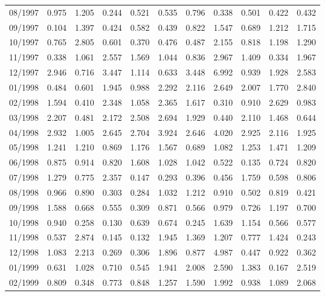 \begin{tabular}{lrrrrrrrrrr}
08/1997 &  0.975 &  1.205 &  0.244 &  0.521 &  0.535 &  0.796 &  0.338 &  0.501 &  0.422 &  0.432 \\
09/1997 &  0.104 &  1.397 &  0.424 &  0.582 &  0.439 &  0.822 &  1.547 &  0.689 &  1.212 &  1.715 \\
10/1997 &  0.765 &  2.805 &  0.601 &  0.370 &  0.476 &  0.487 &  2.155 &  0.818 &  1.198 &  1.290 \\
11/1997 &  0.338 &  1.061 &  2.557 &  1.569 &  1.044 &  0.836 &  2.967 &  1.409 &  0.334 &  1.967 \\
12/1997 &  2.946 &  0.716 &  3.447 &  1.114 &  0.633 &  3.448 &  6.992 &  0.939 &  1.928 &  2.583 \\
01/1998 &  0.484 &  0.601 &  1.945 &  0.988 &  2.292 &  2.116 &  2.649 &  2.007 &  1.770 &  2.840 \\
02/1998 &  1.594 &  0.410 &  2.348 &  1.058 &  2.365 &  1.617 &  0.310 &  0.910 &  2.629 &  0.983 \\
03/1998 &  2.207 &  0.481 &  2.172 &  2.508 &  2.694 &  1.929 &  0.440 &  2.110 &  1.468 &  0.644 \\
04/1998 &  2.932 &  1.005 &  2.645 &  2.704 &  3.924 &  2.646 &  4.020 &  2.925 &  2.116 &  1.925 \\
05/1998 &  1.241 &  1.210 &  0.869 &  1.176 &  1.567 &  0.689 &  1.082 &  1.253 &  1.471 &  1.209 \\
06/1998 &  0.875 &  0.914 &  0.820 &  1.608 &  1.028 &  1.042 &  0.522 &  0.135 &  0.724 &  0.820 \\
07/1998 &  1.279 &  0.775 &  2.357 &  0.147 &  0.293 &  0.396 &  0.456 &  1.759 &  0.598 &  0.806 \\
08/1998 &  0.966 &  0.890 &  0.303 &  0.284 &  1.032 &  1.212 &  0.910 &  0.502 &  0.819 &  0.421 \\
09/1998 &  1.588 &  0.668 &  0.555 &  0.309 &  0.871 &  0.566 &  0.979 &  0.726 &  1.197 &  0.700 \\
10/1998 &  0.940 &  0.258 &  0.130 &  0.639 &  0.674 &  0.245 &  1.639 &  1.154 &  0.566 &  0.577 \\
11/1998 &  0.537 &  2.874 &  0.145 &  0.132 &  1.945 &  1.369 &  1.207 &  0.777 &  1.424 &  0.243 \\
12/1998 &  1.083 &  2.213 &  0.269 &  0.306 &  1.896 &  0.877 &  4.987 &  0.447 &  0.922 &  0.362 \\
01/1999 &  0.631 &  1.028 &  0.710 &  0.545 &  1.941 &  2.008 &  2.590 &  1.383 &  0.167 &  2.519 \\
02/1999 &  0.809 &  0.348 &  0.773 &  0.848 &  1.257 &  1.590 &  1.992 &  0.938 &  1.089 &  2.068 \\

\end{tabular}
